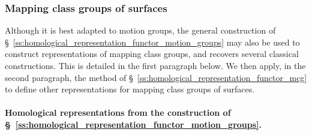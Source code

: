 \documentclass[AHL,Unicode,published]{cedram}
\begin{document}
\subsubsection{Mapping class groups of surfaces}\label{ss:mcg_construction}

Although it is best adapted to motion groups, the general construction of \S~\ref{ss:homological_representation_functor_motion_groups} may also be used to construct representations of mapping class groups, and recovers several classical constructions. This is detailed in the first paragraph below. We then apply, in the second paragraph, the method of \S~\ref{ss:homological_representation_functor_mcg} to define other representations for mapping class groups of surfaces.


\paragraph*{Homological representations from the construction of \S~\ref{ss:homological_representation_functor_motion_groups}.}
\end{document}
